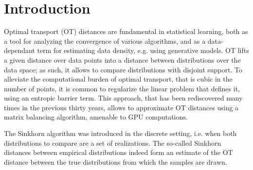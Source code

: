 \section{Introduction}

Optimal transport (OT) distances are fundamental in statistical learning, both
as a tool for analyzing the convergence of various algorithms, and as a
data-dependant term for estimating data density, e.g. using generative models.
OT lifts a given distance over data points into a distance between distributions
over the data space; as such, it allows to compare distributions with disjoint
support. To alleviate the computational burden of optimal transport, that is
cubic in the number of points, it is common to regularize the linear problem
that defines it, using an entropic barrier term. This approach, that has been
rediscovered many times in the previous thirty years, allows to approximate OT
distances using a matrix balancing algorithm, amenable to GPU computations.

The Sinkhorn algorithm was introduced in the discrete setting, i.e. when both
distributions to compare are a set of realizations. The so-called Sinkhorn
distances between empirical distributions indeed form an estimate of the OT
distance between the true distributions from which the samples are drawn.